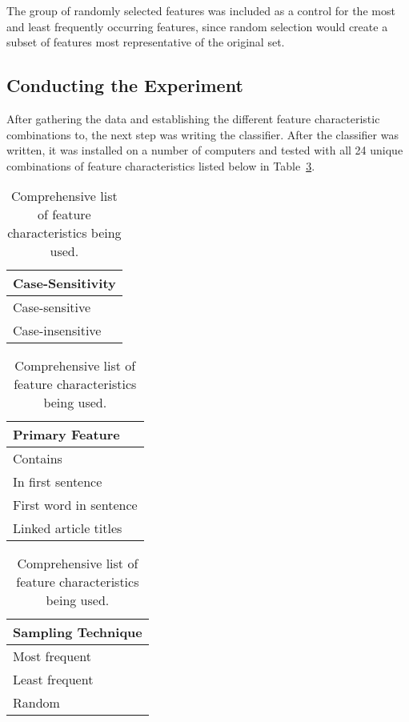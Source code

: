 The group of randomly selected features was included as a control for the most and least frequently occurring features, since random selection would create a subset of features most representative of the original set.

\subsection{Conducting the Experiment}

After gathering the data and establishing the different feature characteristic combinations to, the next step was writing the classifier.
After the classifier was written, it was installed on a number of computers and tested with all 24 unique combinations of feature characteristics listed below in Table~\ref{tab:feature-characteristics}. 

\begin{center}
\begin{table}[H]
\begin{minipage}[t]{.33\linewidth}
\vspace{0pt}
\centering
\begin{tabular}{l}
\textbf{Case-Sensitivity} \\
\hline
Case-sensitive \\
Case-insensitive \\
\end{tabular}
\end{minipage}\hfill
\begin{minipage}[t]{.33\linewidth}
\vspace{0pt}
\centering
\begin{tabular}{l}
\textbf{Primary Feature} \\
\hline
Contains \\
In first sentence \\
First word in sentence \\
Linked article titles \\
\end{tabular}
\end{minipage}\hfill
\begin{minipage}[t]{.33\linewidth}
\vspace{0pt}
\centering
\begin{tabular}{l}
\textbf{Sampling Technique} \\
\hline
Most frequent \\
Least frequent \\
Random \\
\end{tabular}
\end{minipage}
\caption{Comprehensive list of feature characteristics being used.\label{tab:feature-characteristics}}
\end{table}
\end{center}

